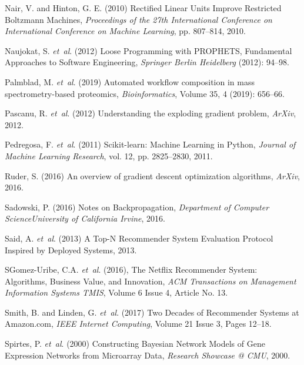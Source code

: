 \documentclass{bioinfo}
\begin{document}
\begin{thebibliography}{}
Nair, V. and Hinton, G. E. (2010) Rectified Linear Units Improve Restricted Boltzmann Machines, {\it Proceedings of the 27th International Conference on International Conference on Machine Learning}, pp. 807--814, 2010.

Naujokat, S. {\it et~al}. (2012) Loose Programming with PROPHETS, Fundamental Approaches to Software Engineering, {\it Springer Berlin Heidelberg} (2012): 94--98.

Palmblad, M. {\it et~al}. (2019) Automated workflow composition in mass spectrometry-based proteomics, {\it Bioinformatics}, Volume 35, 4 (2019): 656--66.

Pascanu, R. {\it et~al}. (2012) Understanding the exploding gradient problem, {\it ArXiv}, 2012.

Pedregosa, F. {\it et~al}. (2011) Scikit-learn: Machine Learning in {P}ython, {\it Journal of Machine Learning Research}, vol. 12, pp. 2825--2830, 2011.

Ruder, S. (2016) An overview of gradient descent optimization algorithms, {\it ArXiv}, 2016.

Sadowski, P. (2016) Notes on Backpropagation, {\it Department of Computer ScienceUniversity of California Irvine}, 2016.

Said, A. {\it et~al}. (2013) A Top-N Recommender System Evaluation Protocol Inspired by Deployed Systems, 2013.

SGomez-Uribe, C.A. {\it et~al}. (2016), The Netflix Recommender System: Algorithms, Business Value, and Innovation, {\it {ACM} Transactions on Management Information Systems {TMIS}}, Volume 6 Issue 4, Article No. 13.

Smith, B. and Linden, G. {\it et~al}. (2017) Two Decades of Recommender Systems at Amazon.com, {\it {IEEE} Internet Computing}, Volume 21 Issue 3, Pages 12--18.

Spirtes, P. {\it et~al}. (2000) Constructing Bayesian Network Models of Gene Expression Networks from Microarray Data, {\it Research Showcase @ CMU}, 2000.


\end{thebibliography}
\end{document}
